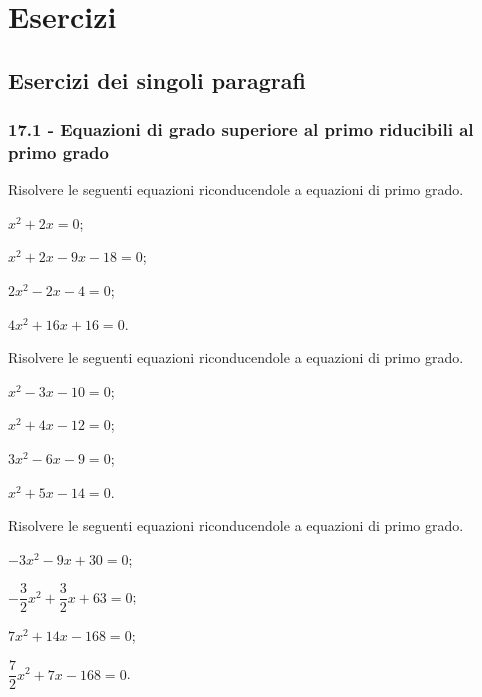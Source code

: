 
\section{Esercizi}

\subsection{Esercizi dei singoli paragrafi}

\subsubsection*{17.1 - Equazioni di grado superiore al primo riducibili al primo grado}

\begin{esercizio}[\Ast]
\label{ese:17.1}
Risolvere le seguenti equazioni riconducendole a equazioni di primo grado.
\begin{multicols}{2}
\begin{enumeratea}
\spazielenx
 \item $x^{2}+2x=0$;
 \item $x^{2}+2x-9x-18=0$;
 \item $2x^{2}-2x-4=0$;
 \item $4x^{2}+16x+16=0$.
\end{enumeratea}
\end{multicols}
\end{esercizio}

\begin{esercizio}[\Ast]
\label{ese:17.2}
Risolvere le seguenti equazioni riconducendole a equazioni di primo grado.
\begin{multicols}{2}
\begin{enumeratea}
\spazielenx
 \item $x^{2}-3x-10=0$;
 \item $x^{2}+4x-12=0$;
 \item $3x^{2}-6x-9=0$;
 \item $x^{2}+5x-14=0$.
\end{enumeratea}
\end{multicols}
\end{esercizio}

\begin{esercizio}[\Ast]
\label{ese:17.3}
Risolvere le seguenti equazioni riconducendole a equazioni di primo grado.
\begin{multicols}{2}
\begin{enumeratea}
\spazielenx
 \item $-3x^{2}-9x+30=0$;
 \item $-{\dfrac{3}{2}}x^{2}+\dfrac{3}{2}x+63=0$;
 \item $7x^{2}+14x-168=0$;
 \item $\dfrac{7}{2}x^{2}+7x-168=0$.
\end{enumeratea}
\end{multicols}
\end{esercizio}

